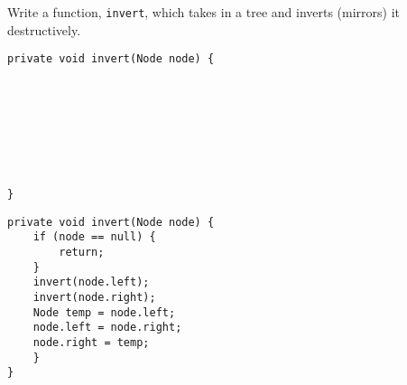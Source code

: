 \begin{blocksection}
\question Write a function, \lstinline$invert$, which takes in a tree and inverts (mirrors) it destructively.

\ifprintanswers
\else
\begin{lstlisting}
private void invert(Node node) {








}
\end{lstlisting}
\fi

\begin{solution}
\begin{lstlisting}
private void invert(Node node) {
    if (node == null) {
        return;
    }
    invert(node.left);
    invert(node.right);
    Node temp = node.left;
    node.left = node.right;
    node.right = temp;
    }
}
\end{lstlisting}
\end{solution}
\end{blocksection}
